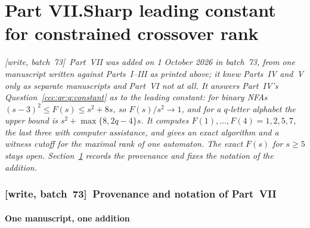 \documentclass[11pt,letterpaper]{article}
\theoremstyle{definition}
\theoremstyle{remark}
\newcommand{\wsevthree}{\textup{[write, batch~73]}}
\begin{document}
\clearpage
{}\part*{Part VII.\quad Sharp leading constant for constrained crossover rank}

\noindent\emph{\wsevthree\ Part~VII was added on 1 October 2026 in batch~73,
from one manuscript written against Parts~I--III as printed above; it knew
Parts~IV and~V only as separate manuscripts and Part~VI not at all. It
answers Part~IV's Question~\ref{ccc:qr:q:constant} as to the leading
constant: for binary NFAs $(s-3)^2\le F(s)\le s^2+8s$, so
$F(s)/s^2\to1$, and for a $q$-letter alphabet the upper bound is
$s^2+\max\{8,2q-4\}s$. It computes $F(1),\ldots,F(4)=1,2,5,7$, the last
three with computer assistance, and gives an exact algorithm and a witness
cutoff for the maximal rank of one automaton. The exact $F(s)$ for $s\ge5$
stays open. Section~\ref{ccc:sc:sec:provenance} records the provenance and
fixes the notation of the addition.}

\section{\texorpdfstring{\wsevthree\ }{}Provenance and notation of Part~VII}
\label{ccc:sc:sec:provenance}

\subsection{One manuscript, one addition}\label{ccc:sc:sec:source}
\end{document}
